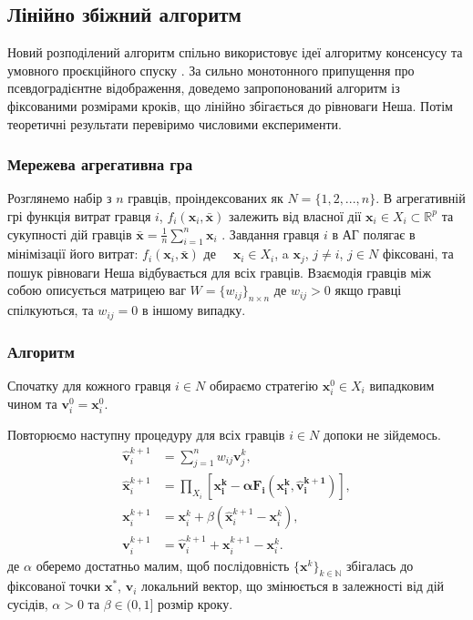 \documentclass[a4paper]{article}
\begin{document}
\clearpage
\subsection{Лінійно збіжний алгоритм \cite{Article2}}\label{alg2}
Новий розподілений алгоритм спільно використовує ідеї алгоритму консенсусу та умовного проєкційного спуску \cite{Cite1}. За сильно монотонного припущення про псевдоградієнтне відображення, доведемо запропонований алгоритм із фіксованими розмірами кроків, що лінійно збігається до рівноваги Неша. Потім теоретичні результати перевіримо числовими експерименти.

\subsubsection{Мережева агрегативна гра}
Розглянемо набір з $n$ гравців, проіндексованих як $N = \{1, 2, ... , n\}$.
В агрегативній грі функція витрат гравця $i$, $f_i (\mathbf{x}_i
, \mathbf{\bar{x}})$ залежить від власної дії $\mathbf{x}_i \in X_i \subset \mathbb{R}^p$ та сукупності дій гравців $\mathbf{\bar{x}} = \frac{1}{n} \sum_{i=1}^{n} \mathbf{x}_i$ . Завдання гравця $i$ в АГ полягає в мінімізації його витрат: $f_i (\mathbf{x}_i, \mathbf{\bar{x}})$ де $\quad\mathbf{x}_i \in X_i$, a $ \mathbf{x}_j$, $j \neq i$, $j \in N$ фіксовані, та пошук рівноваги Неша відбувається для всіх гравців.
Взаємодія гравців між собою описується матрицею ваг $W = \{w_{ij}\}_{n\times n}$ де $w_{ij} > 0$ якщо гравці спілкуються, та $w_{ij} = 0$ в іншому випадку.
\subsubsection*{Алгоритм}
Спочатку для кожного гравця $i \in N$ обираємо стратегію $\mathbf{x}_i^0 \in X_i$ випадковим чином та $\mathbf{v}_i^0=\mathbf{x}_i^0$.

Повторюємо наступну процедуру для всіх гравців $i \in N$ допоки не зійдемось. 
\begin{align}
\mathbf{\hat{v}}^{k+1}_i &= \sum_{j=1}^{n} w_{ij}\mathbf{v}^k_j,\\
\mathbf{\hat{x}}^{k+1}_i &= \prod_{X_i} \left[\mathbf{x_i^k-\alpha F_i\left(\mathbf{x_i^k},\mathbf{\hat{v}}^{k+1}_i\right)}\right],\\
\mathbf{x}^{k+1}_i &= \mathbf{x}^{k}_i + \beta\left(\mathbf{\hat{x}}^{k+1}_i-\mathbf{x}^{k}_i\right),\\
\mathbf{v}^{k+1}_i &= \mathbf{\hat{v}}^{k+1}_i + \mathbf{x}^{k+1}_i-\mathbf{x}^{k}_i.
\end{align}
де $\alpha$ оберемо достатньо малим, щоб послідовність $\{\mathbf{x}^k\}_{k\in \mathbb{N}}$ збігалась до фіксованої точки $\mathbf{x}^*$, $\mathbf{v}_i$ локальний вектор, що змінюється в залежності від дій сусідів, $\alpha > 0$ та $\beta \in (0,1]$ розмір кроку.
\end{document}
